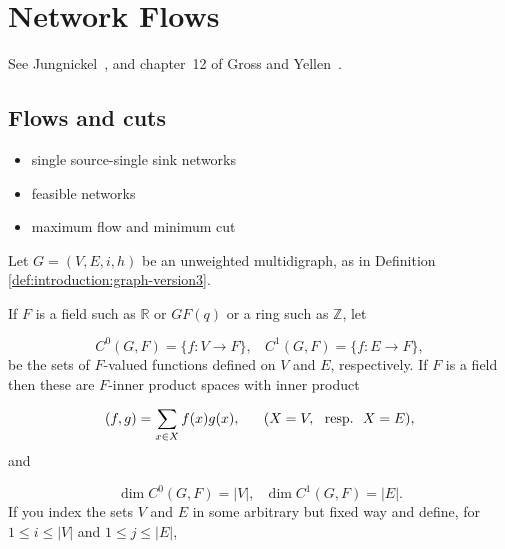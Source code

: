 
\chapter{Network Flows}
\label{chap:network_flows}

See Jungnickel~\cite{Jungnickel2008}, and chapter~12 of Gross and
Yellen~\cite{GrossYellen1999}.



\section{Flows and cuts}

\begin{itemize}
\item single source-single sink networks

\item feasible networks

\item maximum flow and minimum cut
\end{itemize}


Let $G=(V,E,i,h)$ be an unweighted multidigraph, as in
Definition \ref{def:introduction:graph-version3}.

If $F$ is a field such as ${\mathbb{R}}$ or $GF(q)$ or a 
ring such as ${\mathbb{Z}}$, let 

\[
C^0(G, F)=\{f:V\to F\},\ \ \ \ C^1(G, F)=\{f:E\to F\},
\]
be the sets of $F$-valued functions defined on $V$ and
$E$, respectively. 
If $F$ is a field then these are $F$-inner
product spaces with inner product

\begin{equation}
\label{eqn:inner-product}
(f,g)=\sum_{x\in X} f(x)g(x), \ \ \ \ \ (X=V,\ \ {\rm resp.}\ \ X=E),
\end{equation}
and

\[
\dim C^0(G,F)=|V|,\ \ \ \dim C^1(G,F)=|E|.
\]
If you index the sets $V$ and $E$ in some arbitrary but fixed way
and define, for $1\leq i\leq |V|$ and
$1\leq j\leq |E|$,

